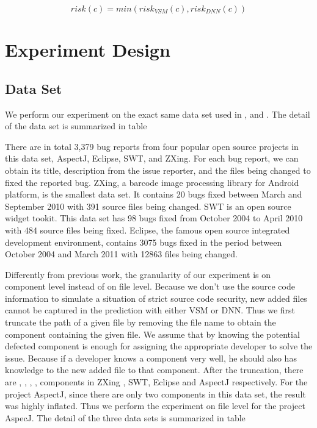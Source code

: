 \begin{equation}
risk(c) = min(risk_{VSM}(c) , risk_{DNN}(c) )
\end{equation}



 
\section{Experiment Design}

\subsection{Data Set }
We perform our experiment on the exact same data set used in \cite{wang2014version} ,\cite{saha2013improving} and \cite{zhou2012should}.
The detail of the data set is summarized in table 


There are in total 3,379 bug reports from four popular open source projects in this data set, AspectJ, Eclipse, SWT, and ZXing. 
For each bug report, we can obtain its title, description from the issue reporter, and the files being changed to fixed the reported bug. 
ZXing, a barcode image processing library for Android platform, is the smallest data set.
It contains 20 bugs fixed between March and September 2010 with 391 source files being changed.
SWT is an open source widget tookit. 
This data set has 98 bugs fixed from October 2004 to April 2010 with 484 source files being fixed. 
Eclipse, the famous open source integrated development environment, contains 3075 bugs fixed in the period between October 2004 and March 2011 with 12863 files being changed.

Differently from previous work, the granularity of our experiment is on component level instead of on file level. 
Because we don't use the source code information to simulate a situation of strict source code security, new added files cannot be captured in the prediction with either VSM or DNN.
Thus we first truncate the path of a given file by removing the file name to obtain the component containing the given file. 
We assume that by knowing the potential defected component is enough for assigning the appropriate developer to solve the issue.
Because if a developer knows a component very well, he should also has knowledge to the new added file to that component.
After the truncation, there are , , , , components in ZXing , SWT, Eclipse and AspectJ respectively. 
For the project AspectJ, since there are only two components in this data set, the result was highly inflated.
Thus we perform the experiment on file level for the project AspecJ. 
The detail of the three data sets is summarized in table 

